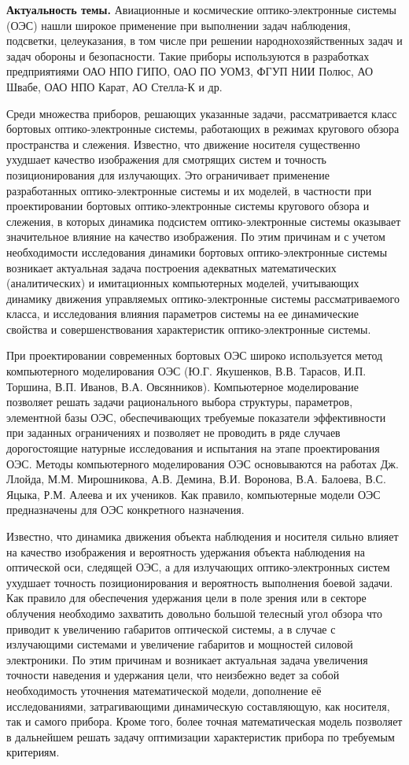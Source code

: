 
{\actuality} \textbf{Актуальность темы.} Авиационные и космические оптико-электронные системы (ОЭС) нашли широкое применение при выполнении задач наблюдения, подсветки, целеуказания, в том числе при решении народнохозяйственных задач и задач обороны и безопасности. Такие приборы используются в разработках предприятиями ОАО НПО ГИПО, ОАО ПО УОМЗ, ФГУП НИИ Полюс, АО Швабе, ОАО НПО Карат, АО Стелла-К и др. 

Среди множества приборов, решающих указанные задачи, рассматривается класс бортовых оптико-электронные системы, работающих в режимах кругового обзора пространства и слежения. Известно, что движение носителя существенно ухудшает качество изображения для смотрящих систем и точность позиционирования для излучающих. Это ограничивает применение разработанных оптико-электронные системы и их моделей, в частности при проектировании бортовых оптико-электронные системы кругового обзора и слежения, в которых динамика подсистем оптико-электронные системы оказывает значительное влияние на качество изображения. По этим причинам и с учетом необходимости исследования динамики бортовых оптико-электронные системы возникает актуальная задача построения адекватных математических (аналитических) и имитационных компьютерных моделей, учитывающих динамику движения управляемых оптико-электронные системы рассматриваемого класса, и исследования влияния параметров системы на ее динамические свойства и совершенствования характеристик оптико-электронные системы.

При проектировании современных бортовых ОЭС широко используется метод компьютерного моделирования ОЭС (Ю.Г. Якушенков, В.В. Тарасов, И.П. Торшина, В.П. Иванов, В.А. Овсянников). Компьютерное моделирование позволяет решать задачи рационального выбора структуры, параметров, элементной базы ОЭС, обеспечивающих требуемые показатели эффективности при заданных ограничениях и позволяет не проводить в ряде случаев дорогостоящие натурные исследования и испытания на этапе проектирования ОЭС. Методы компьютерного моделирования ОЭС основываются на работах Дж. Ллойда, М.М. Мирошникова, А.В. Демина, В.И. Воронова, В.А. Балоева, В.С. Яцыка, Р.М.  Алеева и их учеников. Как правило, компьютерные модели ОЭС предназначены для ОЭС конкретного назначения. 

Известно, что динамика движения объекта наблюдения и носителя сильно влияет на качество изображения и вероятность удержания объекта наблюдения на оптической оси, следящей ОЭС, а для излучающих оптико-электронных систем ухудшает точность позиционирования и вероятность выполнения боевой задачи.  Как правило для обеспечения удержания цели в поле зрения или в секторе облучения необходимо захватить довольно большой телесный угол обзора что приводит к увеличению габаритов оптической системы, а в случае с излучающими системами и увеличение габаритов и мощностей силовой электроники. По этим причинам и возникает актуальная задача увеличения точности наведения и удержания цели, что неизбежно ведет за собой необходимость уточнения математической модели, дополнение её исследованиями, затрагивающими динамическую составляющую, как носителя, так и самого прибора. Кроме того, более точная математическая модель позволяет в дальнейшем решать задачу оптимизации характеристик прибора по требуемым критериям.

